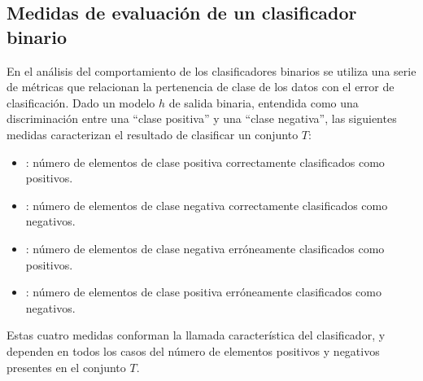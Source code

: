 %
%
\subsection{Medidas de evaluación de un clasificador binario}
%
En el análisis del comportamiento de los clasificadores binarios se
utiliza una serie de métricas que relacionan la pertenencia de clase
de los datos con el error de clasificación.
Dado un modelo $h$ de salida binaria, entendida como una
discriminación entre una ``clase positiva'' y una ``clase negativa'',
las siguientes medidas caracterizan el resultado de clasificar un
conjunto $T$:
%
\begin{itemize}
  \item{}: número de elementos de clase
    positiva correctamente clasificados como positivos.
  \item{}: número de elementos de clase
    negativa correctamente clasificados como negativos.
  \item{}: número de elementos de clase
    negativa erróneamente clasificados como positivos.
  \item{}: número de elementos de clase
    positiva erróneamente clasificados como negativos.
\end{itemize}
%
Estas cuatro medidas conforman la llamada 
característica del clasificador, y dependen en todos los casos del
número de elementos positivos y negativos presentes en el conjunto
$T$.
